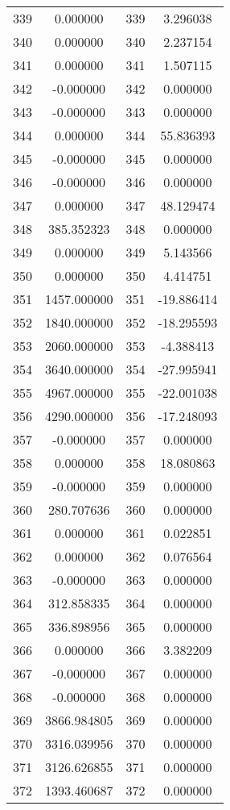 \documentclass[12pt]{article}
\begin{document}
\begin{longtable}{@{}cccc@{}}
339 & 0.000000 & 339 & 3.296038 \\
340 & 0.000000 & 340 & 2.237154 \\
341 & 0.000000 & 341 & 1.507115 \\
342 & -0.000000 & 342 & 0.000000 \\
343 & -0.000000 & 343 & 0.000000 \\
344 & 0.000000 & 344 & 55.836393 \\
345 & -0.000000 & 345 & 0.000000 \\
346 & -0.000000 & 346 & 0.000000 \\
347 & 0.000000 & 347 & 48.129474 \\
348 & 385.352323 & 348 & 0.000000 \\
349 & 0.000000 & 349 & 5.143566 \\
350 & 0.000000 & 350 & 4.414751 \\
351 & 1457.000000 & 351 & -19.886414 \\
352 & 1840.000000 & 352 & -18.295593 \\
353 & 2060.000000 & 353 & -4.388413 \\
354 & 3640.000000 & 354 & -27.995941 \\
355 & 4967.000000 & 355 & -22.001038 \\
356 & 4290.000000 & 356 & -17.248093 \\
357 & -0.000000 & 357 & 0.000000 \\
358 & 0.000000 & 358 & 18.080863 \\
359 & -0.000000 & 359 & 0.000000 \\
360 & 280.707636 & 360 & 0.000000 \\
361 & 0.000000 & 361 & 0.022851 \\
362 & 0.000000 & 362 & 0.076564 \\
363 & -0.000000 & 363 & 0.000000 \\
364 & 312.858335 & 364 & 0.000000 \\
365 & 336.898956 & 365 & 0.000000 \\
366 & 0.000000 & 366 & 3.382209 \\
367 & -0.000000 & 367 & 0.000000 \\
368 & -0.000000 & 368 & 0.000000 \\
369 & 3866.984805 & 369 & 0.000000 \\
370 & 3316.039956 & 370 & 0.000000 \\
371 & 3126.626855 & 371 & 0.000000 \\
372 & 1393.460687 & 372 & 0.000000 \\

\end{longtable}
\end{document}
